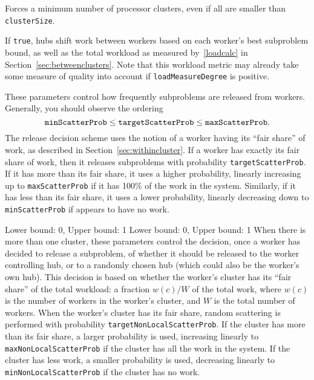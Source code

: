 Forces a minimum number of processor clusters, even if all are smaller than
\texttt{clusterSize}. 

If \texttt{true}, hubs shift work between workers based on each
worker's best subproblem bound,
as well as the total workload as measured by~\eqref{loadcalc} in
Section~\ref{sec:betweenclusters}.  Note that this workload metric
may already take some measure of quality into account if
\texttt{loadMeasureDegree} is positive.

\groupparams
{}
\groupparams
{}
These parameters control
how frequently subproblems are released from workers.  Generally, you
should observe the ordering
$$
\text{\texttt{minScatterProb}} \leq
\text{\texttt{targetScatterProb}} \leq
\text{\texttt{maxScatterProb}}.
$$ 
The release decision scheme uses the notion of a worker having its
``fair share'' of work, as described in
Section~\ref{sec:withincluster}.  If a
worker has exactly its fair share of work, then it releases subproblems with
probability \texttt{targetScatterProb}.  If it has more than its fair
share, it uses a higher probability, linearly increasing up to
\texttt{maxScatterProb} if it has 100\% of the work in the system.
Similarly, if it has less than its fair share, it uses a lower
probability, linearly decreasing down to \texttt{minScatterProb} if
appears to have no work.

\groupparams
{}
        {Lower bound: 0, Upper bound: 1}
\groupparams
{}
        {Lower bound: 0, Upper bound: 1}
When there is more than one cluster, these parameters control the
decision, once a worker has decided to release a subproblem, of
whether it should be released to the worker controlling hub, or to a
randomly chosen hub (which could also be the worker's own hub).  This
decision is based on whether the worker's cluster has its ``fair
share'' of the total workload: a fraction $w(c)/W$ of the total work,
where $w(c)$ is the number of workers in the worker's cluster, and $W$
is the total number of workers.  When the worker's cluster has its
fair share, random scattering is performed with probability
\texttt{targetNonLocalScatterProb}.  If the cluster has more than its
fair share, a larger probability is used, increasing linearly to
\texttt{maxNonLocalScatterProb} if the cluster has all the work in the
system.  If the cluster has less work, a smaller probability is used,
decreasing linearly to \texttt{minNonLocalScatterProb} if the cluster
has no work.


